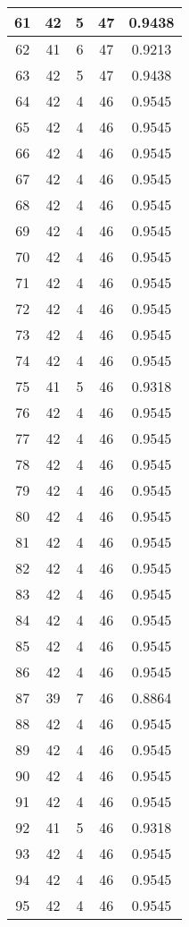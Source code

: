 \documentclass[letterpaper, 12pt]{article}
\begin{document}
\begin{longtable}{|c|c|c|c|c|}
\hline
61 & 42 & 5 & 47 & 0.9438 \\
\hline
62 & 41 & 6 & 47 & 0.9213 \\
\hline
63 & 42 & 5 & 47 & 0.9438 \\
\hline
64 & 42 & 4 & 46 & 0.9545 \\
\hline
65 & 42 & 4 & 46 & 0.9545 \\
\hline
66 & 42 & 4 & 46 & 0.9545 \\
\hline
67 & 42 & 4 & 46 & 0.9545 \\
\hline
68 & 42 & 4 & 46 & 0.9545 \\
\hline
69 & 42 & 4 & 46 & 0.9545 \\
\hline
70 & 42 & 4 & 46 & 0.9545 \\
\hline
71 & 42 & 4 & 46 & 0.9545 \\
\hline
72 & 42 & 4 & 46 & 0.9545 \\
\hline
73 & 42 & 4 & 46 & 0.9545 \\
\hline
74 & 42 & 4 & 46 & 0.9545 \\
\hline
75 & 41 & 5 & 46 & 0.9318 \\
\hline
76 & 42 & 4 & 46 & 0.9545 \\
\hline
77 & 42 & 4 & 46 & 0.9545 \\
\hline
78 & 42 & 4 & 46 & 0.9545 \\
\hline
79 & 42 & 4 & 46 & 0.9545 \\
\hline
80 & 42 & 4 & 46 & 0.9545 \\
\hline
81 & 42 & 4 & 46 & 0.9545 \\
\hline
82 & 42 & 4 & 46 & 0.9545 \\
\hline
83 & 42 & 4 & 46 & 0.9545 \\
\hline
84 & 42 & 4 & 46 & 0.9545 \\
\hline
85 & 42 & 4 & 46 & 0.9545 \\
\hline
86 & 42 & 4 & 46 & 0.9545 \\
\hline
87 & 39 & 7 & 46 & 0.8864 \\
\hline
88 & 42 & 4 & 46 & 0.9545 \\
\hline
89 & 42 & 4 & 46 & 0.9545 \\
\hline
90 & 42 & 4 & 46 & 0.9545 \\
\hline
91 & 42 & 4 & 46 & 0.9545 \\
\hline
92 & 41 & 5 & 46 & 0.9318 \\
\hline
93 & 42 & 4 & 46 & 0.9545 \\
\hline
94 & 42 & 4 & 46 & 0.9545 \\
\hline
95 & 42 & 4 & 46 & 0.9545 \\

\end{longtable}
\end{document}
